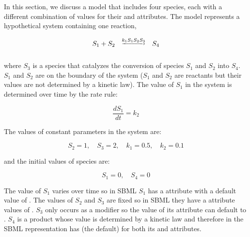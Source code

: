 In this section, we discuss a model that includes four species,
each with a different combination of values for their
 and  attributes.  The model
represents a hypothetical system containing one reaction,
\begin{linenomath}
\begin{equation*}
  \begin{array}{@{}ccc@{}}
    S_1 + S_2 & \overset{\underrightarrow{k_1 S_1 S_2 S_3}}{} & S_4 \\ \\[-4pt]
  \end{array}
\end{equation*}
\end{linenomath}
where $S_3$ is a species that catalyzes the conversion of species
$S_1$ and $S_2$ into $S_4$.  $S_1$ and $S_2$ are on the boundary
of the system (\ie $S_1$ and $S_2$ are reactants but their values
are not determined by a kinetic law).  The value of $S_1$ in the
system is determined over time by the rate rule:
\begin{linenomath}
\begin{equation*}
  \dfrac{d S_1}{d t} = k_2
\end{equation*}
\end{linenomath}
The values of constant parameters in the system are:
\begin{linenomath}
\begin{equation*}
    S_2 = 1, \quad S_3 = 2, \quad k_1 = 0.5, \quad k_2 = 0.1
  \end{equation*}
\end{linenomath}
and the initial values of species are:
\begin{linenomath}
\begin{equation*}
    S_1 = 0, \quad S_4 = 0
\end{equation*}
\end{linenomath}

The value of $S_1$ varies over time so in SBML $S_1$ has a
 attribute with a default value of .  The
values of $S_2$ and $S_3$ are fixed so in SBML they have a
 attribute values of .  $S_3$ only occurs as
a modifier so the value of its  attribute can
default to .  $S_4$ is a product whose value is
determined by a kinetic law and therefore in the SBML
representation has  (the default) for both its
 and  attributes.

